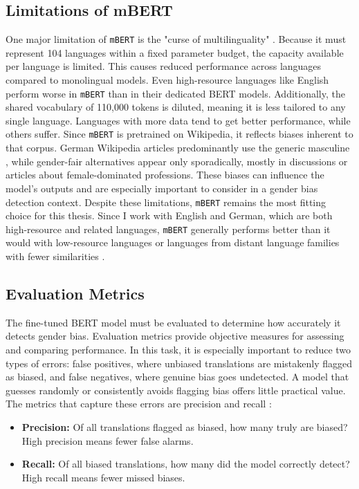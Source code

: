 \subsection{Limitations of mBERT}
    One major limitation of \texttt{mBERT} is the "curse of multilinguality" \parencite{gurgurovMultilingualLargeLanguage2024}. Because it must represent 104 languages within a fixed parameter budget, the capacity available per language is limited. This causes reduced performance across languages compared to monolingual models. Even high-resource languages like English perform worse in \texttt{mBERT} than in their dedicated BERT models. Additionally, the shared vocabulary of 110,000 tokens is diluted, meaning it is less tailored to any single language. Languages with more data tend to get better performance, while others suffer. Since \texttt{mBERT} is pretrained on Wikipedia, it reflects biases inherent to that corpus. German Wikipedia articles predominantly use the generic masculine \parencite{sichlerGenderDifferencesGermanlanguage2014}, while gender-fair alternatives appear only sporadically, mostly in discussions or articles about female-dominated professions. These biases can influence the model’s outputs and are especially important to consider in a gender bias detection context. Despite these limitations, \texttt{mBERT} remains the most fitting choice for this thesis. Since I work with English and German, which are both high-resource and related languages, \texttt{mBERT} generally performs better than it would with low-resource languages or languages from distant language families with fewer similarities \parencite{lauscherZeroHeroLimitations2020}.

\subsection{Evaluation Metrics}
    The fine-tuned BERT model must be evaluated to determine how accurately it detects gender bias. Evaluation metrics provide objective measures for assessing and comparing performance. In this task, it is especially important to reduce two types of errors: false positives, where unbiased translations are mistakenly flagged as biased, and false negatives, where genuine bias goes undetected. A model that guesses randomly or consistently avoids flagging bias offers little practical value. The metrics that capture these errors are precision and recall \parencite{rainioEvaluationMetricsStatistical2024}:

\begin{itemize}
    \item \textbf{Precision:} Of all translations flagged as biased, how many truly are biased? High precision means fewer false alarms.
    \item \textbf{Recall:} Of all biased translations, how many did the model correctly detect? High recall means fewer missed biases.
\end{itemize}

